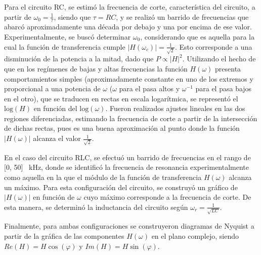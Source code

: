 Para el circuito RC, se estimó la frecuencia de corte, característica del circuito, a partir de $\omega_0=\frac{1}{\tau}$, siendo que $\tau = RC$, y se realizó un barrido de frecuencias que abarcó aproximadamente una década por debajo y una por encima de ese valor.  Experimentalmente, se buscó determinar  $\omega_0$, considerando que es aquella para la cual la función de transferencia cumple $|H(\omega_c)|= \frac{1}{\sqrt{2}}$. Esto corresponde a una disminución de la potencia a la mitad, dado que $P\propto |H|^2$. Utilizando el hecho de que en los regímenes de bajas y altas frecuencias la función $H(\omega)$ presenta comportamientos simples (aproximadamente constante en uno de los extremos y proporcional a una potencia de $\omega$ ($\omega$ para el pasa altos y $\omega^{-1}$ para el pasa bajos en el otro), que se traducen en rectas en escala logarítmica,  se representó el $\text{log}(H)$ en función del $\text{log}(\omega)$. Fueron realizados ajustes lineales en las dos regiones diferenciadas, estimando la frecuencia de corte a partir de la intersección de dichas rectas, pues es una buena aproximación al punto donde la función $|H(\omega)|$ alcanza el valor $\frac{1}{\sqrt{2}}$.  

En el caso del circuito RLC, se efectuó un barrido de frecuencias en el rango de [0, 50] \SI{}{\kilo\hertz}, donde se identificó la frecuencia de resonancia experimentalmente como aquella en la que el módulo de la función de transferencia $H(\omega)$ alcanza un máximo.  Para esta configuración del circuito, se construyó un gráfico de $|H(\omega)|$ en función de $\omega$ cuyo máximo corresponde a la frecuencia de corte. De esta manera, se determinó la inductancia del circuito según $\omega_r=\frac{1}{\sqrt{LC}}$. 


 Finalmente, para ambas configuraciones se construyeron diagramas de Nyquist a partir de la gráfica de las componentes $H(\omega)$ en el plano complejo, siendo $Re(H)=H\cos(\varphi)$ y $Im(H)=H\sin(\varphi)$.